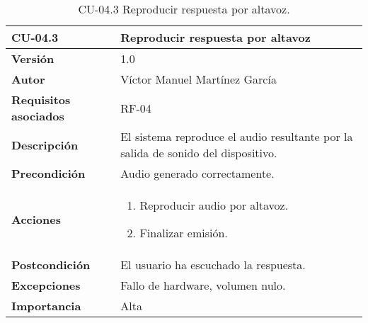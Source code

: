 \begin{table}[p]
    \centering
    \begin{tabularx}{\linewidth}{ p{} p{} }
        \toprule
        \textbf{CU-04.3}    & \textbf{Reproducir respuesta por altavoz}\\
        \toprule
        \textbf{Versión}              & 1.0 \\
        \textbf{Autor}                & Víctor Manuel Martínez García \\
        \textbf{Requisitos asociados} & RF-04 \\
        \textbf{Descripción}          & El sistema reproduce el audio resultante por la salida de sonido del dispositivo.\\
        \textbf{Precondición}         & Audio generado correctamente.\\
        \textbf{Acciones}             &
        \begin{enumerate}
          \item Reproducir audio por altavoz.
          \item Finalizar emisión.
        \end{enumerate}\\
        \textbf{Postcondición}        & El usuario ha escuchado la respuesta.\\
        \textbf{Excepciones}          & Fallo de hardware, volumen nulo.\\
        \textbf{Importancia}          & Alta \\
        \bottomrule
    \end{tabularx}
    \caption{CU-04.3 Reproducir respuesta por altavoz.}
    \label{CU-04.3 Reproducir respuesta por altavoz}
\end{table}





